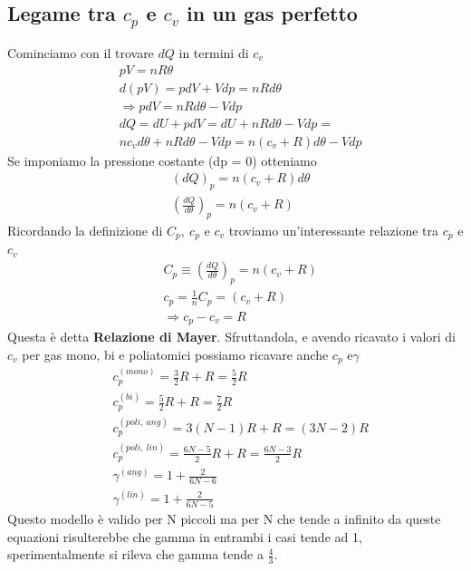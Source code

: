 \documentclass[
10pt, %
a4paper, %
oneside, %
headinclude,footinclude, %
BCOR5mm, %
]{scrartcl}
\begin{document}
\subsection{Legame tra $c_p$ e $c_v$ in un gas perfetto}
Cominciamo con il trovare \(dQ\) in termini di \(c_v\)
\begin{align}
	&pV = n R \theta\nonumber\\
	&d(pV) = pdV + V dp = nRd\theta\nonumber\\
	&\Rightarrow pdV = nRd\theta - Vdp\nonumber \\
	&dQ = dU+pdV = dU + nRd\theta - Vdp =\nonumber\\
	&n c_vd\theta +nRd\theta - Vdp = n(c_v+R)d\theta-Vdp\label{eq:calore_cp}
\end{align}
Se imponiamo la pressione costante (dp = 0) otteniamo
\begin{align*}
	&(dQ)_p=n(c_v+R)d\theta\\
	&\left(\frac{dQ}{d\theta}\right)_p = n(c_v+R)
\end{align*}
Ricordando la definizione di \(C_p,\ c_p\) e \(c_v\) troviamo un'interessante relazione tra $c_p$ e $c_v$
\begin{align}\label{eq:relazione_di_Mayer}
	&C_p \equiv \left(\frac{dQ}{d\theta}\right)_p = n(c_v+R)\nonumber\\
	&c_p = \frac{1}{n} C_p = (c_v + R)\nonumber\\
	& \Rightarrow c_p - c_v = R
\end{align}
Questa è detta \textbf{Relazione di Mayer}. Sfruttandola, e avendo ricavato i valori di $c_v$ per gas mono, bi e poliatomici possiamo ricavare anche \(c_p \) e\(\gamma\)
\begin{align*}
	&c_p^{(mono)} = \frac{3}{2}R + R = \frac{5}{2}R\\
	&c_p^{(bi)} = \frac{5}{2}R + R = \frac{7}{2} R\\
	&c_p^{(poli,\ ang)} = 3(N-1)R + R = (3N - 2) R\\
	&c_p^{(poli,\ lin)} =  \frac{6N-5}{2}R + R = \frac{6N-3}{2}R\\
	&\gamma^{(ang)} = 1 + \frac{2}{6 N - 6}\\
	&\gamma^{(lin)} = 1 + \frac{2}{6 N - 5}
\end{align*}
Questo modello è valido per N piccoli ma per N che tende a infinito da queste equazioni risulterebbe che gamma in entrambi i casi tende ad 1, sperimentalmente si rileva che gamma tende a $\frac{4}{3}$.
\newpage
\end{document}
